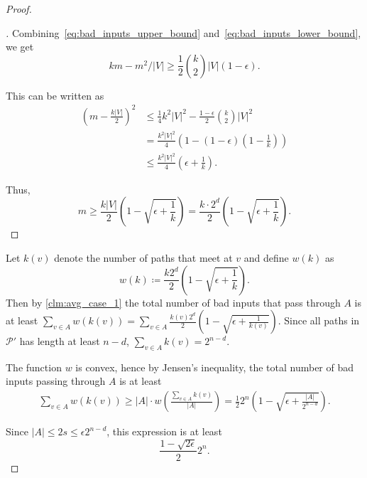 \documentclass[a4paper,11pt,draft]{article}
\newtheorem{corollary}[theorem]{Corollary}
\theoremstyle{definition}
\theoremstyle{remark}
\newenvironment{claimproof}[1][\proofname]{\begin{proof}[#1]\renewcommand*{\qedsymbol}{$\blacksquare$}}{\end{proof}}
\DeclareMathOperator{\dist}{dist}
\newcommand{\card}[1]{{\left|#1\right|}}
\newcommand{\todo}[1]{\textbf{TODO:} #1}
\newcommand{\Q}{{\{0,1\}}}
\newcommand{\calP}{\mathcal{P}}
\newcommand{\readonce}{read-once}
\begin{document}
\begin{proof}
\begin{claimproof}
    Combining~\eqref{eq:bad_inputs_upper_bound} and~\eqref{eq:bad_inputs_lower_bound}, we get
    \[
      km-m^2/\card{V} \ge \frac{1}{2} \binom{k}{2} \card{V} (1-\epsilon).
    \]
  
    This can be written as
    \begin{align*}
      {\left(m-\frac{k\card{V}}{2}\right)}^2 &\le
      \frac{1}{4} k^2 \card{V}^2 - \frac{1-\epsilon}{2}\binom{k}{2}\card{V}^2 \\ &=
      \frac{k^2 \card{V}^2}{4} \left(1 - (1-\epsilon)\left(1-\frac{1}{k}\right)\right) \\ &\le
      \frac{k^2 \card{V}^2}{4} \left(\epsilon + \frac{1}{k}\right).
    \end{align*}
  
    Thus,
    \[
      m \ge \frac{k\card{V}}{2}\left(1 - \sqrt{\epsilon + \frac{1}{k}}\right) = \frac{k\cdot 2^d}{2}\left(1 - \sqrt{\epsilon + \frac{1}{k}}\right).
    \]
  \end{claimproof}

  Let $k(v)$ denote the number of paths that meet at $v$ and define $w(k)$ as
  \[
    w(k) \coloneqq \frac{k 2^d}{2}\left(1-\sqrt{\epsilon+\frac{1}{k}}\right).
  \]
  Then by \cref{clm:avg_case_1} the total number of bad inputs that pass through $A$ is at least $\sum_{v\in A} w(k(v)) = \sum_{v\in A} \frac{k(v) 2^d}{2}\left(1-\sqrt{\epsilon+\frac{1}{k(v)}}\right)$.
  Since all paths in $\calP'$ has length at least $n-d$, $\sum_{v \in A} k(v) = 2^{n-d}$.

  The function $w$ is convex, hence by Jensen's inequality, the total number of bad inputs passing through $A$ is at least
  \begin{align*}
    \sum_{v \in A} w(k(v)) \ge
    \card{A} \cdot w\left(\frac{\sum_{v \in A} k(v)}{\card{A}}\right) = \frac{1}{2} 2^n \left(1-\sqrt{\epsilon + \frac{\card{A}}{2^{n-d}}}\right).
  \end{align*}
  
  Since $\card{A} \le 2s \le \epsilon 2^{n-d}$, this expression is at least
  \[
    \frac{1-\sqrt{2\epsilon}}{2} 2^n.
  \]
\end{proof}


\end{document}
